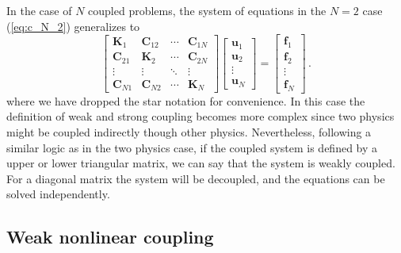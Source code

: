     In the case of $N$ coupled problems, the system of equations in the $N=2$ case (\eqref{eq:c_N_2}) generalizes to
    \begin{equation} \label{eq:multiphysics_strong}
        \begin{bmatrix}
            \mathbf{K}_1    & \mathbf{C}_{12} & \cdots & \mathbf{C}_{1N} \\
            \mathbf{C}_{21} & \mathbf{K}_2    & \cdots & \mathbf{C}_{2N} \\
            \vdots          & \vdots          & \ddots & \vdots          \\
            \mathbf{C}_{N1} & \mathbf{C}_{N2} & \cdots & \mathbf{K}_N
        \end{bmatrix}
        \begin{bmatrix}
            \mathbf{u}_1 \\
            \mathbf{u}_2 \\
            \vdots       \\
            \mathbf{u}_N
        \end{bmatrix}
        =
        \begin{bmatrix}
            \mathbf{f}_1 \\
            \mathbf{f}_2 \\
            \vdots       \\
            \mathbf{f}_N
        \end{bmatrix}\,.
    \end{equation}
    where we have dropped the star notation for convenience. In this case the
    definition of weak and strong coupling
    becomes more complex since two physics might be coupled indirectly though other
    physics. Nevertheless, following a similar logic as in the two physics case, if
    the coupled
    system is defined by a upper or lower triangular matrix, we can say that the
    system is weakly coupled. 
    For a diagonal matrix the system will be decoupled, and the equations can be
    solved independently.

    \subsection*{Weak nonlinear coupling}


